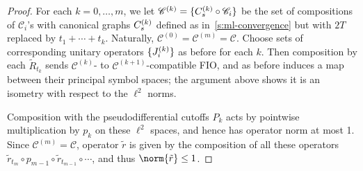 \documentclass[10pt]{article}
\theoremstyle{plain}
\theoremstyle{definition}
\theoremstyle{remark}
\numberwithin{theorem}{section}
\numberwithin{example}{section}
\numberwithin{equation}{section}
\numberwithin{figure}{section}
\newcommand\sref[1]{\textsection\ref{#1}}					%
\newcommand\sC{\mathscr C}		%
\begin{document}
\begin{proof}
	For each $k=0,\dotsc,m$, we let $\sC^{(k)}=\{\smash{C^{\smash{(k)}}_s}\circ \sC_i\}$ be the set of compositions of $\sC_i$'s with canonical graphs $C^{\smash{(k)}}_s$ defined as in~\sref{s:ml-convergence} but with $2T$ replaced by $t_1+\dotsb+t_k$. Naturally, $\sC^{(0)}\!=\sC^{(m)}\!=\sC$. Choose sets of corresponding unitary operators $\{J^{\smash{(k)}}_i\}$ as before for each $k$. Then composition by each $\tilde R_{t_k}$ sends $\sC^{(k)}$- to $\sC^{(k+1)}$-compatible FIO, and as before induces a map between their principal symbol spaces; the argument above shows it is an isometry with respect to the $\ell^2$ norms.
	 
	 Composition with the pseudodifferential cutoffs $P_k$ acts by pointwise multiplication by $p_k$ on these $\ell^2$ spaces, and hence has operator norm at most 1. Since $\sC^{(m)}=\sC$, operator $\tilde r$ is given by the composition of all these operators $\tilde r_{t_m}\circ p_{m-1}\circ \tilde r_{t_{m-1}}\circ\dotsb$, and thus $\norm{\tilde r}\leq 1$.
\end{proof}
\end{document}
